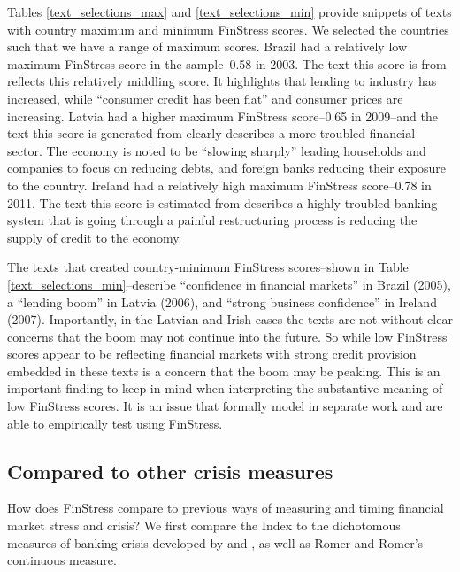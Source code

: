 \documentclass[]{article}
\begin{document}
Tables \ref{text_selections_max} and \ref{text_selections_min} provide snippets of texts with country maximum and minimum FinStress scores. We selected the countries such that we have a range of maximum scores. Brazil had a relatively low maximum FinStress score in the sample--0.58 in 2003. The text this score is from reflects this relatively middling score. It highlights that lending to industry has increased, while ``consumer credit has been flat'' and consumer prices are increasing. Latvia had a higher maximum FinStress score--0.65 in 2009--and the text this score is generated from clearly describes a more troubled financial sector. The economy is noted to be ``slowing sharply'' leading households and companies to focus on reducing debts, and foreign banks reducing their exposure to the country. Ireland had a relatively high maximum FinStress score--0.78 in 2011. The text this score is estimated from describes a highly troubled banking system that is going through a painful restructuring process  is reducing the supply of credit to the economy.

The texts that created country-minimum FinStress scores--shown in Table \ref{text_selections_min}--describe ``confidence in financial markets'' in Brazil (2005), a ``lending boom'' in Latvia (2006), and ``strong business confidence'' in Ireland (2007). Importantly, in the Latvian and Irish cases the texts are not without clear concerns that the boom may not continue into the future. So while low FinStress scores appear to be reflecting financial markets with strong credit provision embedded in these texts is a concern that the boom may be peaking. This is an important finding to keep in mind when interpreting the substantive meaning of low FinStress scores. It is an issue that \cite{gandrud_pepinsky2015} formally model in separate work and are able to empirically test using FinStress.

\subsection{Compared to other crisis
measures}\label{comparison-to-other-crisis-measures}

How does FinStress compare to previous ways of measuring and timing financial market stress and crisis? We first compare the Index to the dichotomous measures of banking crisis developed by \cite{Reinhart2009} and \cite{laeven2013}, as well as Romer and Romer's \citeyearpar{Romer2015} continuous measure.
\end{document}
